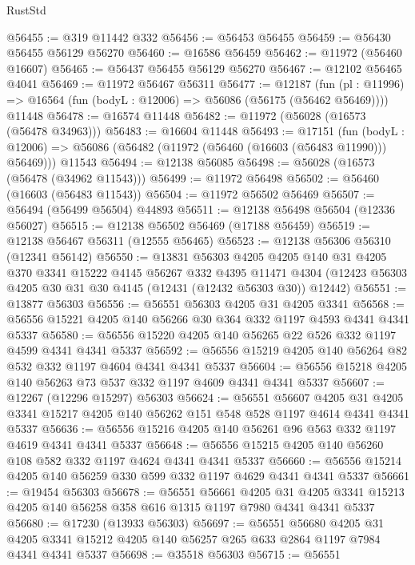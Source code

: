 \begin{lexlean}{RustStd}
\begin{coremodule}
@56455 := @319 @11442 @332
@56456 := @56453 @56455
@56459 := @56430 @56455 @56129 @56270
@56460 := @16586 @56459
@56462 := @11972 (@56460 @16607)
@56465 := @56437 @56455 @56129 @56270
@56467 := @12102 @56465 @4041
@56469 := @11972 @56467 @56311
@56477 := @12187
    (fun (pl : @11996) => @16564 (fun (bodyL : @12006) => @56086 (@56175 (@56462 @56469))))
    @11448
@56478 := @16574 @11448
@56482 := @11972 (@56028 (@16573 (@56478 @34963)))
@56483 := @16604 @11448
@56493 := @17151
    (fun (bodyL : @12006) => @56086 (@56482 (@11972 (@56460 (@16603 (@56483 @11990))) @56469)))
    @11543
@56494 := @12138 @56085
@56498 := @56028 (@16573 (@56478 (@34962 @11543)))
@56499 := @11972 @56498
@56502 := @56460 (@16603 (@56483 @11543))
@56504 := @11972 @56502 @56469
@56507 := @56494 (@56499 @56504) @44893
@56511 := @12138 @56498 @56504 (@12336 @56027)
@56515 := @12138 @56502 @56469 (@17188 @56459)
@56519 := @12138 @56467 @56311 (@12555 @56465)
@56523 := @12138 @56306 @56310 (@12341 @56142)
@56550 := @13831
    @56303
    @4205
    @4205
    @140
    @31
    @4205
    @370
    @3341
    @15222
    @4145
    @56267
    @332
    @4395
    @11471
    @4304
    (@12423 @56303 @4205 @30 @31 @30 @4145 (@12431 (@12432 @56303 @30)) @12442)
@56551 := @13877 @56303
@56556 := @56551 @56303 @4205 @31 @4205 @3341
@56568 := @56556 @15221 @4205 @140 @56266 @30 @364 @332 @1197 @4593 @4341 @4341 @5337
@56580 := @56556 @15220 @4205 @140 @56265 @22 @526 @332 @1197 @4599 @4341 @4341 @5337
@56592 := @56556 @15219 @4205 @140 @56264 @82 @532 @332 @1197 @4604 @4341 @4341 @5337
@56604 := @56556 @15218 @4205 @140 @56263 @73 @537 @332 @1197 @4609 @4341 @4341 @5337
@56607 := @12267 (@12296 @15297) @56303
@56624 := @56551
    @56607
    @4205
    @31
    @4205
    @3341
    @15217
    @4205
    @140
    @56262
    @151
    @548
    @528
    @1197
    @4614
    @4341
    @4341
    @5337
@56636 := @56556 @15216 @4205 @140 @56261 @96 @563 @332 @1197 @4619 @4341 @4341 @5337
@56648 := @56556 @15215 @4205 @140 @56260 @108 @582 @332 @1197 @4624 @4341 @4341 @5337
@56660 := @56556 @15214 @4205 @140 @56259 @330 @599 @332 @1197 @4629 @4341 @4341 @5337
@56661 := @19454 @56303
@56678 := @56551
    @56661
    @4205
    @31
    @4205
    @3341
    @15213
    @4205
    @140
    @56258
    @358
    @616
    @1315
    @1197
    @7980
    @4341
    @4341
    @5337
@56680 := @17230 (@13933 @56303)
@56697 := @56551
    @56680
    @4205
    @31
    @4205
    @3341
    @15212
    @4205
    @140
    @56257
    @265
    @633
    @2864
    @1197
    @7984
    @4341
    @4341
    @5337
@56698 := @35518 @56303
@56715 := @56551

\end{coremodule}
\end{lexlean}

